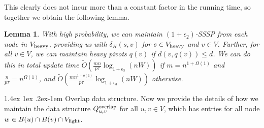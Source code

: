 \documentclass[11pt]{article}
\makeatletter
\newtheorem{lemma}[theorem]{Lemma}
\theoremstyle{definition}
\theoremstyle{remark}
\renewcommand{\paragraph}{%
  \@startsection{paragraph}{4}%
  {\z@}{1.4ex \@plus 1ex \@minus .2ex}{-1em}%
  {\normalfont\normalsize\bfseries}%
}
\makeatother
\begin{document}
This clearly does not incur more than a constant factor in the running time, so together we obtain the following lemma. 

\begin{lemma} \label{lm:heavy_MSSP}
    With high probability, we can maintain $(1+\epsilon_2)$-SSSP from each node in $ V_{\rm{heavy}} $, providing us with $\delta_H(s,v)$ for $s\in V_{\rm{heavy}}$ and $v\in V$. Further, for all $v\in V$, we can maintain heavy pivots $q(v)$ if $d(v,q(v))\leq d$. We can do this in total update time $ \tilde O (\tfrac{m n }{p\tau}\log_{1+\epsilon_3}(nW)) $ if $m=n^{1+\Omega(1)}$ and $\tfrac{n}{p\tau}=n^{\Omega(1)}$, and $ \tilde O (\tfrac{m n^{1+o(1)} }{p\tau}\log_{1+\epsilon_3}(nW)) $ otherwise. 
\end{lemma}


\paragraph{Overlap data structure.}
Now we provide the details of how we maintain the data structure $Q^{\rm{overlap}}_{u,v}$ for all $u,v\in V$, which has entries for all node $w\in B(u)\cap B(v)\cap V_{\rm{light}}$.


\end{document}
